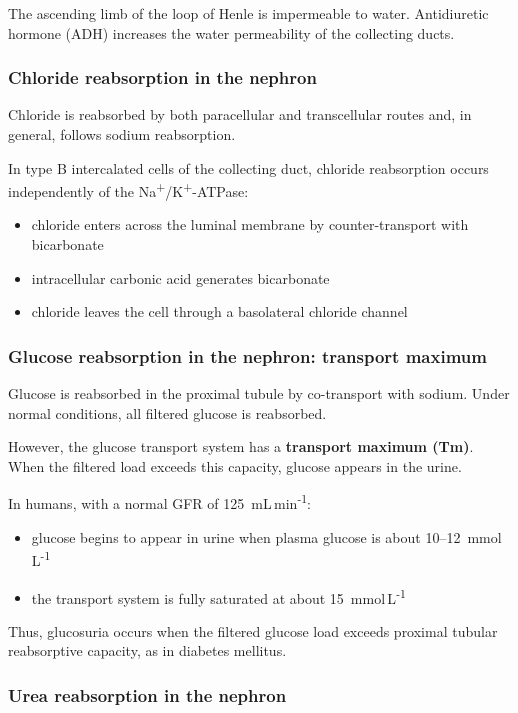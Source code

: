 \documentclass[11pt,a4paper]{article}
\begin{document}
The ascending limb of the loop of Henle is impermeable to water. Antidiuretic hormone (ADH) increases the water permeability of the collecting ducts.

\subsubsection{Chloride reabsorption in the nephron}

Chloride is reabsorbed by both paracellular and transcellular routes and, in general, follows sodium reabsorption.

In type B intercalated cells of the collecting duct, chloride reabsorption occurs independently of the Na\textsuperscript{+}/K\textsuperscript{+}-ATPase:
\begin{itemize}
    \item chloride enters across the luminal membrane by counter-transport with bicarbonate
    \item intracellular carbonic acid generates bicarbonate
    \item chloride leaves the cell through a basolateral chloride channel
\end{itemize}

\subsubsection{Glucose reabsorption in the nephron: transport maximum}

Glucose is reabsorbed in the proximal tubule by co-transport with sodium. Under normal conditions, all filtered glucose is reabsorbed.

However, the glucose transport system has a \textbf{transport maximum (Tm)}. When the filtered load exceeds this capacity, glucose appears in the urine.

In humans, with a normal GFR of 125~mL\,min\textsuperscript{-1}:
\begin{itemize}
    \item glucose begins to appear in urine when plasma glucose is about 10--12~mmol\,L\textsuperscript{-1}
    \item the transport system is fully saturated at about 15~mmol\,L\textsuperscript{-1}
\end{itemize}

Thus, glucosuria occurs when the filtered glucose load exceeds proximal tubular reabsorptive capacity, as in diabetes mellitus.

\subsubsection{Urea reabsorption in the nephron}
\end{document}
